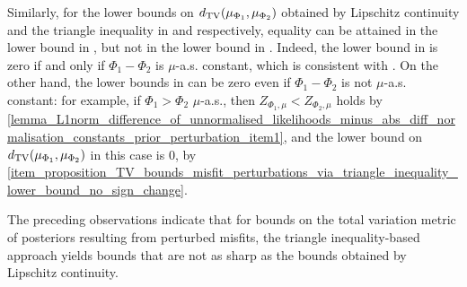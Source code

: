 \documentclass[a4paper]{scrartcl}
\theoremstyle{definition}
\numberwithin{equation}{section}
\newcommand{\TV}[0]{\textup{TV}}
\begin{document}
Similarly, for the lower bounds on $d_{\TV}(\mu_{\Phi_1},\mu_{\Phi_2})$ obtained by Lipschitz continuity and the triangle inequality in   and  respectively, equality can be attained in the lower bound in , but not in the lower bound in .
Indeed, the lower bound in  is zero if and only if $\Phi_1-\Phi_2$ is $\mu$-a.s. constant, which is consistent with .
On the other hand, the lower bounds in  can be zero even if $\Phi_1-\Phi_2$ is not $\mu$-a.s. constant: for example, if $\Phi_1>\Phi_2$ $\mu$-a.s., then $Z_{\Phi_1,\mu}<Z_{\Phi_2,\mu}$ holds by \ref{lemma_L1norm_difference_of_unnormalised_likelihoods_minus_abs_diff_normalisation_constants_prior_perturbation_item1}, and the lower bound on $d_{\TV}(\mu_{\Phi_1},\mu_{\Phi_2})$ in this case is 0, by \ref{item_proposition_TV_bounds_misfit_perturbations_via_triangle_inequality_lower_bound_no_sign_change}.

The preceding observations indicate that for bounds on the total variation metric of posteriors resulting from perturbed misfits, the triangle inequality-based approach yields bounds that are not as sharp as the bounds obtained by Lipschitz continuity.
\end{document}
